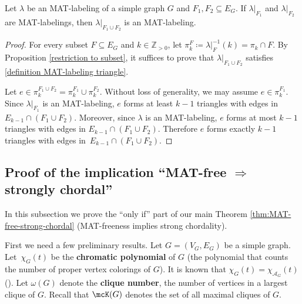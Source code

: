 \begin{lemma}\label{restriction to the union}
Let $ \lambda $ be an MAT-labeling of a simple graph $ G $ and $ F_{1}, F_{2} \subseteq E_{G} $. 
If $ \lambda|_{F_{1}} $ and $ \lambda|_{F_{2}} $ are MAT-labelings, then $ \lambda|_{F_{1} \cup F_{2}} $ is an MAT-labeling. 
\end{lemma}
\begin{proof}
For every subset $ F \subseteq E_{G} $ and $ k \in \mathbb{Z}_{>0} $, let $ \pi_{k}^{F} \coloneqq \lambda|_{F}^{-1}(k) = \pi_{k} \cap F $.
By Proposition  \ref{restriction to subset}, it suffices to prove that $ \lambda|_{F_{1} \cup F_{2}} $ satisfies \ref{definition MAT-labeling triangle}. 

Let $ e \in \pi_{k}^{F_{1}\cup F_{2}} = \pi_{k}^{F_{1}} \cup \pi_{k}^{F_{2}} $. 
Without loss of generality, we may assume $ e \in \pi_{k}^{F_{1}} $. 
Since $ \lambda|_{F_{1}} $ is an MAT-labeling, $ e $ forms at least $ k-1 $ triangles with edges in~$ E_{k-1} \cap (F_{1} \cup F_{2}) $. 
Moreover, since $ \lambda $ is an MAT-labeling, $ e $ forms at most $ k-1 $ triangles with edges in $ E_{k-1} \cap (F_{1} \cup F_{2}) $. 
Therefore $ e $ forms exactly $ k-1 $ triangles with edges in~$ E_{k-1} \cap (F_{1} \cup F_{2}) $. 
\end{proof}

\subsection{Proof of the implication ``MAT-free \texorpdfstring{$\Rightarrow$}{implies} strongly chordal''}
\label{subsec:MAT-free implies strongly chordal}
 
In this subsection we prove the ``only if'' part of our main Theorem \ref{thm:MAT-free-strong-chordal} (MAT-freeness implies strong chordality).

First we need a few preliminary results.
Let $ G = (V_{G}, E_{G}) $ be a simple graph. 
Let~$ \chi_G(t)$ be the \textbf{chromatic polynomial} of $G$ (the polynomial that counts the number of proper vertex colorings of $G$). 
It is known that $ \chi_G(t) = \chi_{ \mathcal{A}_{G} }(t) $ (\eg  \cite[Theorem 2.88]{OT92}).
Let $ \omega(G) $ denote the \textbf{clique number}, the number of vertices in a largest clique of $ G $. 
Recall that $\mcK(G)$ denotes the set of all maximal cliques of $G$.

